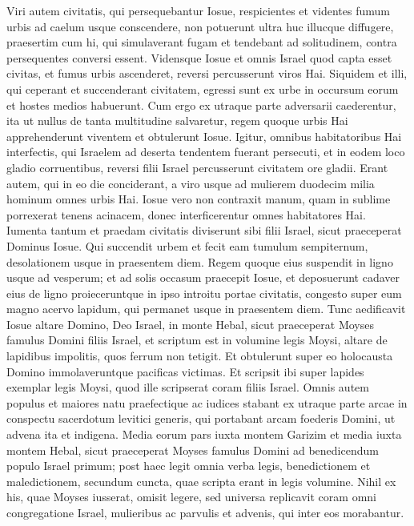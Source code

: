 \begin{biblechapter}
\verse Viri autem civitatis, qui persequebantur Iosue, respicientes et videntes fumum urbis ad caelum usque conscendere, non potuerunt ultra huc illucque diffugere, praesertim cum hi, qui simulaverant fugam et tendebant ad solitudinem, contra persequentes conversi essent. 
\verse Vidensque Iosue et omnis Israel quod capta esset civitas, et fumus urbis ascenderet, reversi percusserunt viros Hai. 
\verse Siquidem et illi, qui ceperant et succenderant civitatem, egressi sunt ex urbe in occursum eorum et hostes medios habuerunt. Cum ergo ex utraque parte adversarii caederentur, ita ut nullus de tanta multitudine salvaretur, 
\verse regem quoque urbis Hai apprehenderunt viventem et obtulerunt Iosue. 
\verse Igitur, omnibus habitatoribus Hai interfectis, qui Israelem ad deserta tendentem fuerant persecuti, et in eodem loco gladio corruentibus, reversi filii Israel percusserunt civitatem ore gladii. 
\verse Erant autem, qui in eo die conciderant, a viro usque ad mulierem duodecim milia hominum omnes urbis Hai.  
\verse Iosue vero non contraxit manum, quam in sublime porrexerat tenens acinacem, donec interficerentur omnes habitatores Hai. 
\verse Iumenta tantum et praedam civitatis diviserunt sibi filii Israel, sicut praeceperat Dominus Iosue. 
\verse Qui succendit urbem et fecit eam tumulum sempiternum, desolationem usque in praesentem diem. 
\verse Regem quoque eius suspendit in ligno usque ad vesperum; et ad solis occasum praecepit Iosue, et deposuerunt cadaver eius de ligno proieceruntque in ipso introitu portae civitatis, congesto super eum magno acervo lapidum, qui permanet usque in praesentem diem. 
\verse Tunc aedificavit Iosue altare Domino, Deo Israel, in monte Hebal, 
\verse sicut praeceperat Moyses famulus Domini filiis Israel, et scriptum est in volumine legis Moysi, altare de lapidibus impolitis, quos ferrum non tetigit. Et obtulerunt super eo holocausta Domino immolaveruntque pacificas victimas. 
\verse Et scripsit ibi super lapides exemplar legis Moysi, quod ille scripserat coram filiis Israel. 
\verse Omnis autem populus et maiores natu praefectique ac iudices stabant ex utraque parte arcae in conspectu sacerdotum levitici generis, qui portabant arcam foederis Domini, ut advena ita et indigena. Media eorum pars iuxta montem Garizim et media iuxta montem Hebal, sicut praeceperat Moyses famulus Domini ad benedicendum populo Israel primum; 
\verse post haec legit omnia verba legis, benedictionem et maledictionem, secundum cuncta, quae scripta erant in legis volumine. 
\verse Nihil ex his, quae Moyses iusserat, omisit legere, sed universa replicavit coram omni congregatione Israel, mulieribus ac parvulis et advenis, qui inter eos morabantur. 
\end{biblechapter}

